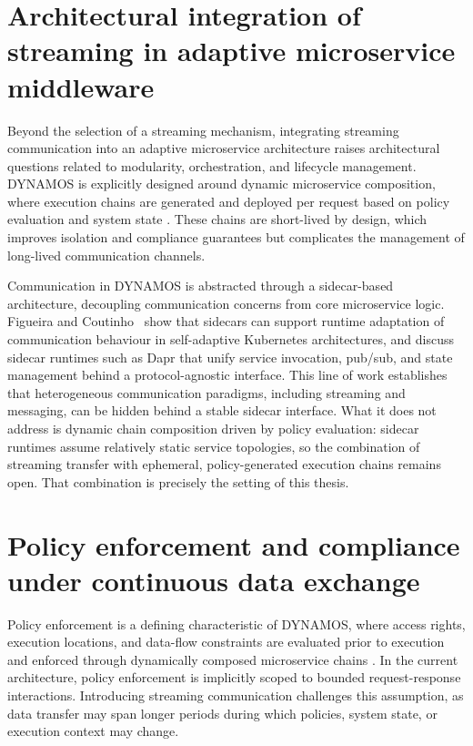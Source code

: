 \section{Architectural integration of streaming in adaptive microservice middleware}

Beyond the selection of a streaming mechanism, integrating streaming communication into an adaptive microservice architecture raises architectural questions related to modularity, orchestration, and lifecycle management. DYNAMOS is explicitly designed around dynamic microservice composition, where execution chains are generated and deployed per request based on policy evaluation and system state \cite{stutterheim2023thesis,stutterheim2023icsa}. These chains are short-lived by design, which improves isolation and compliance guarantees but complicates the management of long-lived communication channels.

Communication in DYNAMOS is abstracted through a sidecar-based architecture, decoupling communication concerns from core microservice logic. Figueira and Coutinho~\cite{figueira2024selfadaptive} show that sidecars can support runtime adaptation of communication behaviour in self-adaptive Kubernetes architectures, and discuss sidecar runtimes such as Dapr that unify service invocation, pub/sub, and state management behind a protocol-agnostic interface. This line of work establishes that heterogeneous communication paradigms, including streaming and messaging, can be hidden behind a stable sidecar interface. What it does not address is dynamic chain composition driven by policy evaluation: sidecar runtimes assume relatively static service topologies, so the combination of streaming transfer with ephemeral, policy-generated execution chains remains open. That combination is precisely the setting of this thesis.

\section{Policy enforcement and compliance under continuous data exchange}

Policy enforcement is a defining characteristic of DYNAMOS, where access rights, execution locations, and data-flow constraints are evaluated prior to execution and enforced through dynamically composed microservice chains \cite{stutterheim2023thesis,stutterheim2023icsa}. In the current architecture, policy enforcement is implicitly scoped to bounded request-response interactions. Introducing streaming communication challenges this assumption, as data transfer may span longer periods during which policies, system state, or execution context may change.

